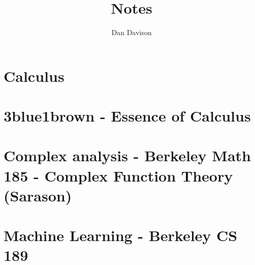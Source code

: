 \documentclass{book}
\title{Notes}
\author{Dan Davison}
\begin{document}
\frontmatter
\maketitle
\tableofcontents
\mainmatter
\chapter{Calculus}


\chapter{3blue1brown - Essence of Calculus}


\chapter{Complex analysis - Berkeley Math 185 - Complex Function Theory (Sarason)}


\chapter{Machine Learning - Berkeley CS 189}


\end{document}
